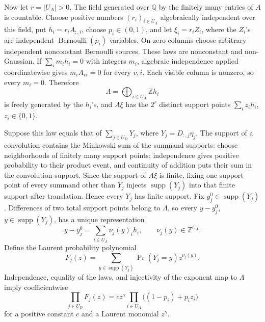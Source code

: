 Now let \(r=|U_A|>0\). The field generated over \(\mathbb Q\) by the finitely many entries of \(A\) is countable. Choose positive numbers \((r_i)_{i\in U_A}\) algebraically independent over this field, put \(h_i=r_iA_{:,i}\), choose \(p_i\in(0,1)\), and let \(\xi_i=r_iZ_i\), where the \(Z_i\)'s are independent \(\operatorname{Bernoulli}(p_i)\) variables. On zero columns choose arbitrary independent nonconstant Bernoulli sources. These laws are nonconstant and non-Gaussian. If \(\sum_i m_ih_i=0\) with integers \(m_i\), algebraic independence applied coordinatewise gives \(m_iA_{vi}=0\) for every \(v,i\). Each visible column is nonzero, so every \(m_i=0\). Therefore
\[
\Lambda=\bigoplus_{i\in U_A}\mathbb Z h_i
\]
is freely generated by the \(h_i\)'s, and \(A\xi\) has the \(2^r\) distinct support points \(\sum_i z_ih_i\), \(z_i\in\{0,1\}\).

Suppose this law equals that of \(\sum_{j\in U_D}Y_j\), where \(Y_j=D_{:,j}\eta_j\). The support of a convolution contains the Minkowski sum of the summand supports: choose neighborhoods of finitely many support points; independence gives positive probability to their product event, and continuity of addition puts their sum in the convolution support. Since the support of \(A\xi\) is finite, fixing one support point of every summand other than \(Y_j\) injects \(\operatorname{supp}(Y_j)\) into that finite support after translation. Hence every \(Y_j\) has finite support. Fix \(y_j^0\in\operatorname{supp}(Y_j)\). Differences of two total support points belong to \(\Lambda\), so every \(y-y_j^0\), \(y\in\operatorname{supp}(Y_j)\), has a unique representation
\[
y-y_j^0=\sum_{i\in U_A}\nu_j(y)_ih_i,
\qquad \nu_j(y)\in\mathbb Z^{U_A}.
\]
Define the Laurent probability polynomial
\[
F_j(z)=\sum_{y\in\operatorname{supp}(Y_j)}\Pr(Y_j=y)z^{\nu_j(y)}.
\]
Independence, equality of the laws, and injectivity of the exponent map to \(\Lambda\) imply coefficientwise
\[
\prod_{j\in U_D}F_j(z)=c z^\gamma\prod_{i\in U_A}\bigl((1-p_i)+p_i z_i\bigr) \tag{4}
\]
for a positive constant \(c\) and a Laurent monomial \(z^\gamma\).

